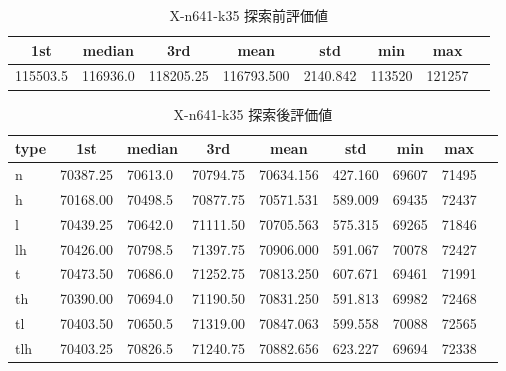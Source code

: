 \begin{table}[htbp]
    \centering
    \caption{X-n641-k35 探索前評価値}
    \begin{tabular}{|l|l|l|l|l|l|l|l|}\hline
    \multicolumn{1}{|c|}{\textbf{1st}}
    &\multicolumn{1}{c|}{\textbf{median}}
    &\multicolumn{1}{c|}{\textbf{3rd}}
    &\multicolumn{1}{c|}{\textbf{mean}}
    &\multicolumn{1}{c|}{\textbf{std}}
    &\multicolumn{1}{c|}{\textbf{min}}
    &\multicolumn{1}{c|}{\textbf{max}}\\\hline
	115503.5 & 116936.0 & 118205.25 & 116793.500 & 2140.842 & 113520 & 121257\\\hline
	\end{tabular}
\end{table}
\begin{table}[htbp]
    \centering
    \caption{X-n641-k35 探索後評価値}
    \begin{tabular}{|l|l|l|l|l|l|l|l|l|}\hline
    \multicolumn{1}{|c|}{\textbf{type}}
    &\multicolumn{1}{|c|}{\textbf{1st}}
    &\multicolumn{1}{c|}{\textbf{median}}
    &\multicolumn{1}{c|}{\textbf{3rd}}
    &\multicolumn{1}{c|}{\textbf{mean}}
    &\multicolumn{1}{c|}{\textbf{std}}
    &\multicolumn{1}{c|}{\textbf{min}}
    &\multicolumn{1}{c|}{\textbf{max}}\\\hline
	n & 70387.25 & 70613.0 & 70794.75 & 70634.156 & 427.160 & 69607 & 71495\\\hline
	h & 70168.00 & 70498.5 & 70877.75 & 70571.531 & 589.009 & 69435 & 72437\\\hline
	l & 70439.25 & 70642.0 & 71111.50 & 70705.563 & 575.315 & 69265 & 71846\\\hline
	lh & 70426.00 & 70798.5 & 71397.75 & 70906.000 & 591.067 & 70078 & 72427\\\hline
	t & 70473.50 & 70686.0 & 71252.75 & 70813.250 & 607.671 & 69461 & 71991\\\hline
	th & 70390.00 & 70694.0 & 71190.50 & 70831.250 & 591.813 & 69982 & 72468\\\hline
	tl & 70403.50 & 70650.5 & 71319.00 & 70847.063 & 599.558 & 70088 & 72565\\\hline
	tlh & 70403.25 & 70826.5 & 71240.75 & 70882.656 & 623.227 & 69694 & 72338\\\hline
	\end{tabular}
\end{table}
